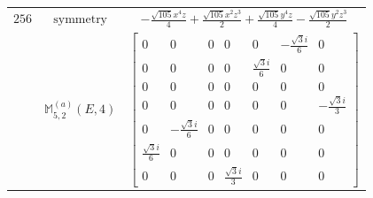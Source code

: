 \documentclass[fleqn,8pt,landscape]{jsarticle}
\begin{document}
\begin{longtable}{ccc}
$ 256 $ & $ \text{symmetry} $ & $ - \frac{\sqrt{105} x^{4} z}{4} + \frac{\sqrt{105} x^{2} z^{3}}{2} + \frac{\sqrt{105} y^{4} z}{4} - \frac{\sqrt{105} y^{2} z^{3}}{2} $ \\
$  $ & $ \mathbb{M}_{5,2}^{(a)}(E,4) $ & $ \begin{bmatrix} 0 & 0 & 0 & 0 & 0 & - \frac{\sqrt{3} i}{6} & 0 \\ 0 & 0 & 0 & 0 & \frac{\sqrt{3} i}{6} & 0 & 0 \\ 0 & 0 & 0 & 0 & 0 & 0 & 0 \\ 0 & 0 & 0 & 0 & 0 & 0 & - \frac{\sqrt{3} i}{3} \\ 0 & - \frac{\sqrt{3} i}{6} & 0 & 0 & 0 & 0 & 0 \\ \frac{\sqrt{3} i}{6} & 0 & 0 & 0 & 0 & 0 & 0 \\ 0 & 0 & 0 & \frac{\sqrt{3} i}{3} & 0 & 0 & 0 \end{bmatrix} $ \\ \hline
\end{longtable}
\end{document}
